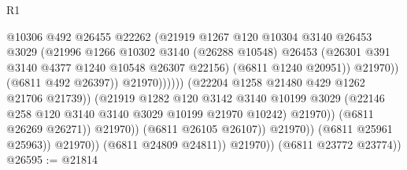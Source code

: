 \begin{lexlean}{R1}
\begin{coremodule}
                                                  @10306
                                                  @492
                                                  @26455
                                                  @22262
                                                  (@21919
                                                    @1267
                                                    @120
                                                    @10304
                                                    @3140
                                                    @26453
                                                    @3029
                                                    (@21996
                                                      @1266
                                                      @10302
                                                      @3140
                                                      (@26288 @10548)
                                                      @26453
                                                      (@26301
                                                        @391
                                                        @3140
                                                        @4377
                                                        @1240
                                                        @10548
                                                        @26307
                                                        @22156)
                                                      (@6811 @1240 @20951))
                                                    @21970))
                                                (@6811 @492 @26397))
                                              @21970))))))
                                  (@22204 @1258 @21480 @429 @1262 @21706 @21739))
                                (@21919
                                  @1282
                                  @120
                                  @3142
                                  @3140
                                  @10199
                                  @3029
                                  (@22146 @258 @120 @3140 @3140 @3029 @10199 @21970 @10242)
                                  @21970))
                              (@6811 @26269 @26271))
                            @21970))
                        (@6811 @26105 @26107))
                      @21970))
                  (@6811 @25961 @25963))
                @21970))
            (@6811 @24809 @24811))
          @21970))
      (@6811 @23772 @23774))
@26595 := @21814

\end{coremodule}
\end{lexlean}
